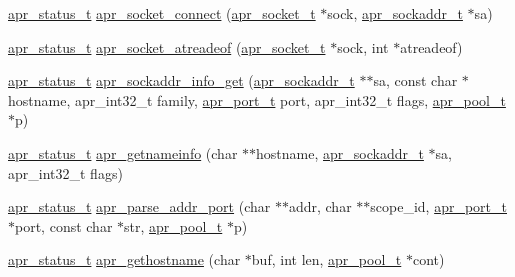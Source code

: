 \begin{DoxyCompactItemize}
\item 
\hyperlink{group__apr__errno_gaf76ee4543247e9fb3f3546203e590a6c}{apr\+\_\+status\+\_\+t} \hyperlink{group__apr__network__io_ga8e58bd8112ed2ce5004487918cd9275e}{apr\+\_\+socket\+\_\+connect} (\hyperlink{group__apr__network__io_ga49262b223e7434746e1f1737659aa2c3}{apr\+\_\+socket\+\_\+t} $\ast$sock, \hyperlink{structapr__sockaddr__t}{apr\+\_\+sockaddr\+\_\+t} $\ast$sa)
\item 
\hyperlink{group__apr__errno_gaf76ee4543247e9fb3f3546203e590a6c}{apr\+\_\+status\+\_\+t} \hyperlink{group__apr__network__io_gabfcb1fe4447921e5b86d395126b5d6f0}{apr\+\_\+socket\+\_\+atreadeof} (\hyperlink{group__apr__network__io_ga49262b223e7434746e1f1737659aa2c3}{apr\+\_\+socket\+\_\+t} $\ast$sock, int $\ast$atreadeof)
\item 
\hyperlink{group__apr__errno_gaf76ee4543247e9fb3f3546203e590a6c}{apr\+\_\+status\+\_\+t} \hyperlink{group__apr__network__io_gaa2f399ca2b60b35c0abf7630298c6c9f}{apr\+\_\+sockaddr\+\_\+info\+\_\+get} (\hyperlink{structapr__sockaddr__t}{apr\+\_\+sockaddr\+\_\+t} $\ast$$\ast$sa, const char $\ast$hostname, apr\+\_\+int32\+\_\+t family, \hyperlink{group__apr__network__io_gaa670a71960f6eb4fe0d0de2a1e7aba03}{apr\+\_\+port\+\_\+t} port, apr\+\_\+int32\+\_\+t flags, \hyperlink{group__apr__pools_gaf137f28edcf9a086cd6bc36c20d7cdfb}{apr\+\_\+pool\+\_\+t} $\ast$p)
\item 
\hyperlink{group__apr__errno_gaf76ee4543247e9fb3f3546203e590a6c}{apr\+\_\+status\+\_\+t} \hyperlink{group__apr__network__io_ga7a56fd9573b942753738ec30b887c9de}{apr\+\_\+getnameinfo} (char $\ast$$\ast$hostname, \hyperlink{structapr__sockaddr__t}{apr\+\_\+sockaddr\+\_\+t} $\ast$sa, apr\+\_\+int32\+\_\+t flags)
\item 
\hyperlink{group__apr__errno_gaf76ee4543247e9fb3f3546203e590a6c}{apr\+\_\+status\+\_\+t} \hyperlink{group__apr__network__io_ga90c31b2f012c6b1e2d842a96c4431de3}{apr\+\_\+parse\+\_\+addr\+\_\+port} (char $\ast$$\ast$addr, char $\ast$$\ast$scope\+\_\+id, \hyperlink{group__apr__network__io_gaa670a71960f6eb4fe0d0de2a1e7aba03}{apr\+\_\+port\+\_\+t} $\ast$port, const char $\ast$str, \hyperlink{group__apr__pools_gaf137f28edcf9a086cd6bc36c20d7cdfb}{apr\+\_\+pool\+\_\+t} $\ast$p)
\item 
\hyperlink{group__apr__errno_gaf76ee4543247e9fb3f3546203e590a6c}{apr\+\_\+status\+\_\+t} \hyperlink{group__apr__network__io_ga6bd3d656ba935ca428075f477b8a6f8b}{apr\+\_\+gethostname} (char $\ast$buf, int len, \hyperlink{group__apr__pools_gaf137f28edcf9a086cd6bc36c20d7cdfb}{apr\+\_\+pool\+\_\+t} $\ast$cont)

\end{DoxyCompactItemize}

